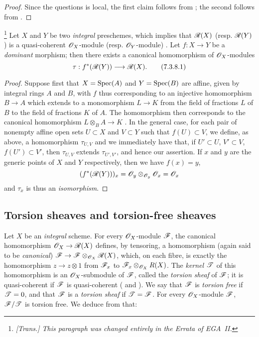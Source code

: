 \begin{proof}
Since the questions is local, the first claim follows from ; the second follows from .
\end{proof}

\begin{env}[7.3.8]
\label{I.7.3.8}
\footnote{\emph{[Trans.] This paragraph was changed entirely in the Errata of EGA~II.}}
Let $X$ and $Y$ be two \emph{integral} preschemes, which implies that $\mathscr{R}(X)$ (resp. $\mathscr{R}(Y)$) is a quasi-coherent $\mathscr{O}_X$-module (resp. $\mathscr{O}_Y$-module) .
Let $f:X\to Y$ be a \emph{dominant} morphism; then there exists a canonical homomorphism of $\mathscr{O}_X$-modules
\[
\label{I.7.3.8.1}
  \tau:f^*(\sh{R}(Y))\to\sh{R}(X).
  \tag{7.3.8.1}
\]
\end{env}

\begin{proof}
Suppose first that $X=\operatorname{Spec}(A)$ and $Y=\operatorname{Spec}(B)$ are affine, given by integral rings $A$ and $B$, with $f$ thus corresponding to an injective homomorphism $B\to A$ which extends to a monomorphism $L\to K$ from the field of fractions $L$ of $B$ to the field of fractions $K$ of $A$.
The homomorphism  then corresponds to the canonical homomorphism $L\otimes_B A\to K$ .
In the general case, for each pair of nonempty affine open sets $U\subset X$ and $V\subset Y$ such that $f(U)\subset V$, we define, as above, a homomorphism $\tau_{U,V}$ and we immediately have that, if $U'\subset U$, $V'\subset V$, $f(U')\subset V'$, then $\tau_{U,V}$ extends $\tau_{U',V'}$, and hence our assertion.
If $x$ and $y$ are the generic points of $X$ and $Y$ respectively, then we have $f(x)=y$,
\[
  (f^*(\mathscr{R}(Y)))_x=\mathscr{O}_y\otimes_{\mathscr{O}_y}\mathscr{O}_x=\mathscr{O}_x
\]
 and $\tau_x$ is thus an \emph{isomorphism}.
\end{proof}

\subsection{Torsion sheaves and torsion-free sheaves}
\label{subsection:I.7.4}

\begin{env}[7.4.1]
\label{I.7.4.1}
Let $X$ be an \emph{integral} scheme.
For every $\mathscr{O}_X$-module $\mathscr{F}$, the canonical homomorphism $\sh{O}_X\to\sh{R}(X)$ defines, by tensoring, a homomorphism (again said to be \emph{canonical}) $\sh{F}\to\sh{F}\otimes_{\sh{O}_X}\sh{R}(X)$, which, on each fibre, is exactly the homomorphism $z\to z\otimes1$ from $\mathscr{F}_x$ to $\mathscr{F}_x\otimes_{\mathscr{O}_X}R(X)$.
The \emph{kernel $\mathscr{T}$} of this homomorphism is an $\mathscr{O}_X$-submodule of $\mathscr{F}$, called the \emph{torsion sheaf} of $\mathscr{F}$; it is quasi-coherent if $\mathscr{F}$ is quasi-coherent ( and ).
We say that $\mathscr{F}$ is \emph{torsion free} if $\mathscr{T}=0$, and that $\mathscr{F}$ is a \emph{torsion sheaf} if $\mathscr{T}=\mathscr{F}$.
For every $\mathscr{O}_X$-module $\mathscr{F}$, $\mathscr{F}/\mathscr{T}$ is torsion free.
We deduce from  that:
\end{env}

